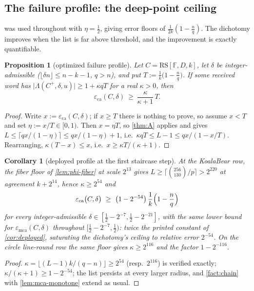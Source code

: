 \documentclass[11pt]{article}
\newtheorem{proposition}[theorem]{Proposition}
\newtheorem{corollary}[theorem]{Corollary}
\theoremstyle{definition}
\theoremstyle{remark}
\newcommand{\F}{\mathbb{F}}
\newcommand{\RS}{\mathrm{RS}}
\newcommand{\eca}{\varepsilon_{\mathrm{ca}}}
\newcommand{\emca}{\varepsilon_{\mathrm{mca}}}
\newcommand{\Lst}{\Lambda}
\begin{document}
\subsection{The failure profile: the deep-point ceiling}\label{sec:answers-profile}

 was used throughout with $\eta=\frac12$, giving error floors of $\frac1{2k}(1-\frac nq)$. The dichotomy improves when the list is far above threshold, and the improvement is exactly quantifiable.

\begin{proposition}[optimized failure profile]\label{prop:profile}
Let $C=\RS[\F,D,k]$, let $\delta$ be integer-admissible \textup($\lfloor\delta n\rfloor\le n-k-1$, $q>n$\textup), and put $T:=\frac1k\bigl(1-\frac nq\bigr)$. If some received word has $\bigl|\Lst(C^+,\delta,u)\bigr|\ge1+\kappa qT$ for a real $\kappa>0$, then
\[
\eca(C,\delta)\ \ge\ \frac{\kappa}{\kappa+1}\,T .
\]
\end{proposition}

\begin{proof}
Write $x:=\eca(C,\delta)$; if $x\ge T$ there is nothing to prove, so assume $x<T$ and set $\eta:=x/T\in[0,1)$. Then $x=\eta T$, so \cref{thm:A} applies and gives $L\le\lceil qx/(1-\eta)\rceil\le qx/(1-\eta)+1$, i.e.\ $\kappa qT\le L-1\le qx/(1-x/T)$. Rearranging, $\kappa(T-x)\le x$, i.e.\ $x\ge\kappa T/(\kappa+1)$.
\end{proof}

\begin{corollary}[deployed profile at the first staircase step]\label{cor:profile-deployed}
At the KoalaBear row, the fiber floor of \cref{lem:phi-fiber} at scale $2^{13}$ gives $L\ge\lceil\binom{256}{130}/p\rceil>2^{220}$ at agreement $k+2^{14}$, hence $\kappa\ge2^{54}$ and
\[
\eca\bigl(C,\delta\bigr)\ \ge\ \bigl(1-2^{-54}\bigr)\,\frac1k\Bigl(1-\frac nq\Bigr)
\]
for every integer-admissible $\delta\in[\frac12-2^{-7},\frac12-2^{-21}]$, with the same lower bound for $\emca(C,\delta)$ throughout $[\frac12-2^{-7},\frac12)$: twice the printed constant of \cref{cor:deployed}, saturating the dichotomy's ceiling to relative error $2^{-54}$. On the circle line-round row the same floor gives $\kappa\ge2^{116}$ and the factor $1-2^{-116}$.
\end{corollary}

\begin{proof}
$\kappa=\lfloor(L-1)k/(q-n)\rfloor\ge2^{54}$ \textup(resp.\ $2^{116}$\textup) is verified exactly; $\kappa/(\kappa+1)\ge1-2^{-54}$; the list persists at every larger radius, and \cref{fact:chain} with \cref{lem:mca-monotone} extend as usual.
\end{proof}
\end{document}
